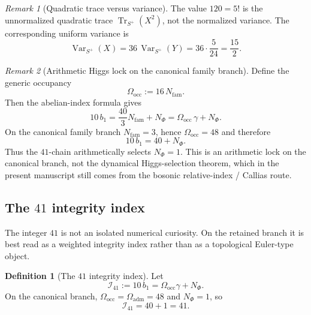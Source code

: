 \documentclass[11pt,a4paper]{article}
\theoremstyle{definition}
\newtheorem{definition}[theorem]{Definition}
\theoremstyle{remark}
\newtheorem*{remark}{Remark}
\DeclareMathOperator{\tr}{Tr}
\newcommand{\bone}{b_1}
\newcommand{\Oadm}{\Omega_{\mathrm{adm}}}
\begin{document}
\begin{remark}[Quadratic trace versus variance]
The value $120=5!$ is the unnormalized quadratic trace $\tr_{S^+}(X^2)$, not the normalized variance. The corresponding uniform variance is
\[
\operatorname{Var}_{S^+}(X)=36\,\operatorname{Var}_{S^+}(Y)=36\cdot\frac{5}{24}=\frac{15}{2}.
\]
\end{remark}

\begin{remark}[Arithmetic Higgs lock on the canonical family branch]
Define the generic occupancy
\[
\Omega_{\mathrm{occ}}:=16\,N_{\mathrm{fam}}.
\]
Then the abelian-index formula gives
\[
10\,\bone
=
\frac{40}{3}N_{\mathrm{fam}}+N_\Phi
=
\Omega_{\mathrm{occ}}\,\gamma+N_\Phi.
\]
On the canonical family branch $N_{\mathrm{fam}}=3$, hence $\Omega_{\mathrm{occ}}=48$ and therefore
\[
10\,\bone=40+N_\Phi.
\]
Thus the $41$-chain arithmetically selects $N_\Phi=1$. This is an arithmetic lock on the canonical branch, not the dynamical Higgs-selection theorem, which in the present manuscript still comes from the bosonic relative-index / Callias route.
\end{remark}

\subsection{The \texorpdfstring{$41$}{41} integrity index}

The integer $41$ is not an isolated numerical curiosity. On the retained branch it is best read as a weighted integrity index rather than as a topological Euler-type object.
\begin{definition}[The \texorpdfstring{$41$}{41} integrity index]
\label{def:integrity-index-41}
Let
\[
\mathcal I_{41}:=10\,\bone=\Omega_{\mathrm{occ}}\gamma+N_\Phi.
\]
On the canonical branch, $\Omega_{\mathrm{occ}}=\Oadm=48$ and $N_\Phi=1$, so
\[
\mathcal I_{41}=40+1=41.
\]
\end{definition}
\end{document}
